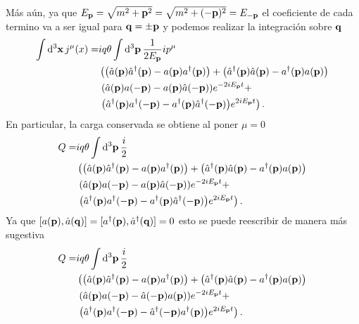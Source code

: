 \documentclass{article}
\begin{document}
\begin{enumerate}[(a)]
\begin{align}
\begin{split}
\end{split}
\end{align}
Más aún, ya que $E_{\vb{p}}=\sqrt{m^2+\vb{p}^2}=\sqrt{m^2+(-\vb{p})^2}=E_{-\vb{p}}$ el coeficiente de cada termino va a ser igual para $\vb{q}=\pm\vb{p}$ y podemos realizar la integración sobre $\vb{q}$
\begin{align}
\begin{split}
\int\dd[3]{\vb{x}}j^\mu(x)=&iq\theta\int\dd[3]{\vb{p}}\frac{1}{2E_{\vb{p}}}ip^\mu\\
&\left(\qty(\hat{a}(\vb{p})\hat{a}^\dagger(\vb{p})-a(\vb{p})a^\dagger(\vb{p}))+\qty(\hat{a}^\dagger(\vb{p})\hat{a}(\vb{p})-a^\dagger(\vb{p})a(\vb{p}))\right.\\
&\left.\qty(\hat{a}(\vb{p})a(-\vb{p})-a(\vb{p})\hat{a}(-\vb{p}))e^{-2iE_{\vb{p}}t}+\right.\\
&\left.\qty(\hat{a}^\dagger(\vb{p})a^\dagger(-\vb{p})-a^\dagger(\vb{p})\hat{a}^\dagger(-\vb{p}))e^{2iE_{\vb{p}}t}\right).
\end{split}
\end{align}
En particular, la carga conservada se obtiene al poner $\mu=0$
\begin{align}
\begin{split}
Q=&iq\theta\int\dd[3]{\vb{p}}\frac{i}{2}\\
&\left(\qty(\hat{a}(\vb{p})\hat{a}^\dagger(\vb{p})-a(\vb{p})a^\dagger(\vb{p}))+\qty(\hat{a}^\dagger(\vb{p})\hat{a}(\vb{p})-a^\dagger(\vb{p})a(\vb{p}))\right.\\
&\left.\qty(\hat{a}(\vb{p})a(-\vb{p})-a(\vb{p})\hat{a}(-\vb{p}))e^{-2iE_{\vb{p}}t}+\right.\\
&\left.\qty(\hat{a}^\dagger(\vb{p})a^\dagger(-\vb{p})-a^\dagger(\vb{p})\hat{a}^\dagger(-\vb{p}))e^{2iE_{\vb{p}}t}\right).
\end{split}
\end{align}
Ya que $[a(\vb{p}),\hat{a}(\vb{q})]=[a^\dagger(\vb{p}),\hat{a}^\dagger(\vb{q})]=0$ esto se puede reescribir de manera más sugestiva
\begin{align}
\begin{split}
Q=&iq\theta\int\dd[3]{\vb{p}}\frac{i}{2}\\
&\left(\qty(\hat{a}(\vb{p})\hat{a}^\dagger(\vb{p})-a(\vb{p})a^\dagger(\vb{p}))+\qty(\hat{a}^\dagger(\vb{p})\hat{a}(\vb{p})-a^\dagger(\vb{p})a(\vb{p}))\right.\\
&\left.\qty(\hat{a}(\vb{p})a(-\vb{p})-\hat{a}(-\vb{p})a(\vb{p}))e^{-2iE_{\vb{p}}t}+\right.\\
&\left.\qty(\hat{a}^\dagger(\vb{p})a^\dagger(-\vb{p})-\hat{a}^\dagger(-\vb{p})a^\dagger(\vb{p}))e^{2iE_{\vb{p}}t}\right).

\end{split}
\end{align}
\end{enumerate}
\end{document}
